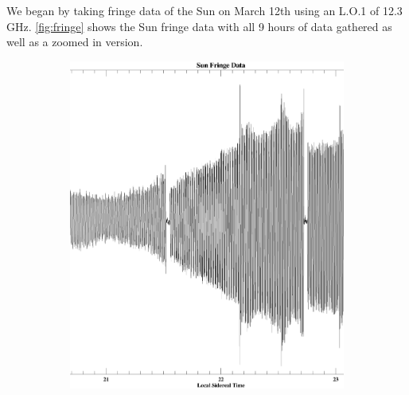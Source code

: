 \documentclass{article}
\begin{document}
We began by taking fringe data of the Sun on March 12th using an L.O.1 of 12.3 GHz. \autoref{fig:fringe} shows the Sun fringe data with all 9 hours of data gathered as well as a zoomed in version.


\begin{figure}
        \centering
        \begin{subfigure}[b]{\textwidth}
                \centering
                \includegraphics[width=6in]{sun_fringe.ps}
                \caption{}
                \label{fig:fringeout}
        \end{subfigure}%
        \newline
        \begin{subfigure}[b]{\textwidth}
        	       \centering

\end{subfigure}
\end{figure}
\end{document}
